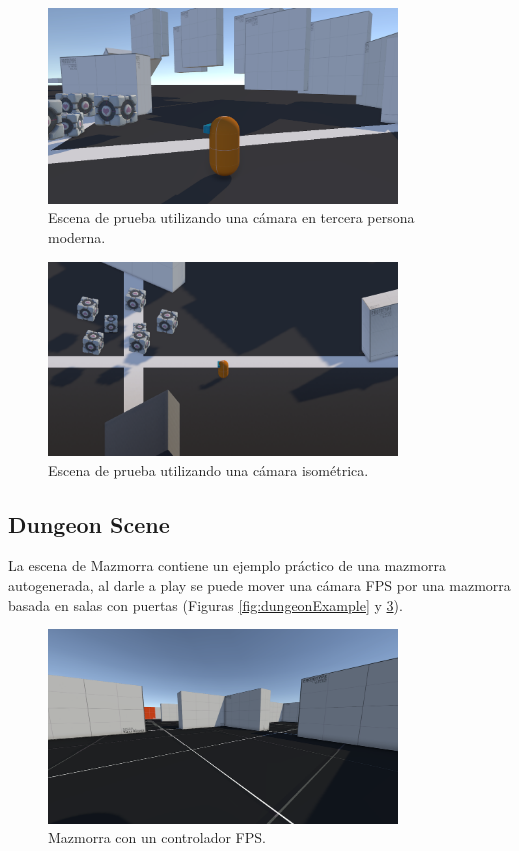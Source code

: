 \begin{figure}[H]
   \centering
     \includegraphics[width=350px,clip=true]{TPSTestScene.png}
   \caption{Escena de prueba utilizando una cámara en tercera persona moderna.}
   \label{fig:tpsGame}
\end{figure}

\begin{figure}[H]
   \centering
     \includegraphics[width=350px,clip=true]{3DISometric.png}
   \caption{Escena de prueba utilizando una cámara isométrica.}
   \label{fig:isoGame}
\end{figure}

\subsection{Dungeon Scene}
La escena de Mazmorra contiene un ejemplo práctico de una mazmorra autogenerada, al darle a play se puede mover una cámara FPS por una mazmorra
 basada en salas con puertas (Figuras \ref{fig:dungeonExample} y \ref{fig:fpsDungeon}).

\begin{figure}[H]
   \centering
     \includegraphics[width=350px,clip=true]{3DFPSDungeonTestScene.png}
   \caption{Mazmorra con un controlador FPS.}
   \label{fig:fpsDungeon}
 \end{figure}

